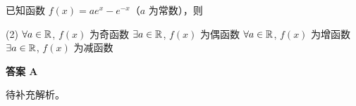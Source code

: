 \begin{choice}[source={2025深圳二模}, topic={含参函数的奇偶与单调性}]
已知函数 $f(x) = ae^x - e^{-x}$（$a$ 为常数），则
\begin{tasks}(2)
	\task $\forall a \in \mathbb{R}$, $f(x)$ 为奇函数
	\task $\exists a \in \mathbb{R}$, $f(x)$ 为偶函数
	\task $\forall a \in \mathbb{R}$, $f(x)$ 为增函数
	\task $\exists a \in \mathbb{R}$, $f(x)$ 为减函数
\end{tasks}
\end{choice}
\begin{choice-sol}
\textbf{答案 A}

待补充解析。
\end{choice-sol}
